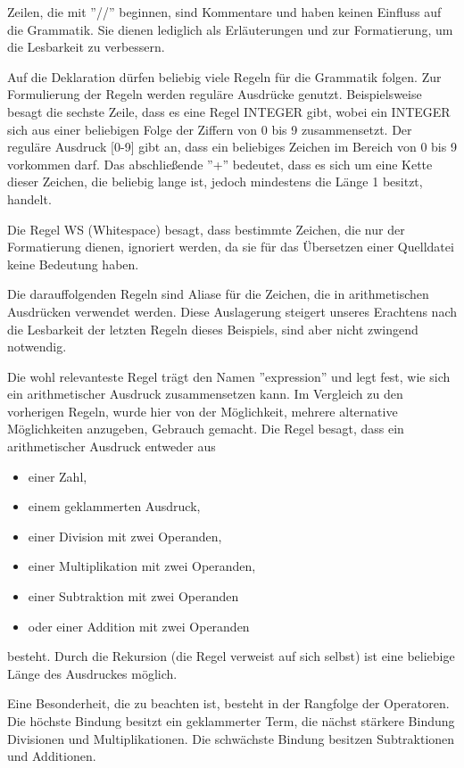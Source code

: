 Zeilen, die mit ''//'' beginnen, sind Kommentare und haben keinen Einfluss auf die Grammatik. Sie dienen lediglich als Erläuterungen und zur Formatierung, um die Lesbarkeit zu verbessern.

Auf die Deklaration dürfen beliebig viele Regeln für die Grammatik folgen. Zur Formulierung der Regeln werden reguläre Ausdrücke genutzt. Beispielsweise besagt die sechste Zeile, dass es eine Regel INTEGER gibt, wobei ein INTEGER sich aus einer beliebigen Folge der Ziffern von 0 bis 9 zusammensetzt. Der reguläre Ausdruck [0-9] gibt an, dass ein beliebiges Zeichen im Bereich von 0 bis 9 vorkommen darf. Das abschließende ''+'' bedeutet, dass es sich um eine Kette dieser Zeichen, die beliebig lange ist, jedoch mindestens die Länge 1 besitzt, handelt.

Die Regel WS (Whitespace) besagt, dass bestimmte Zeichen, die nur der Formatierung dienen, ignoriert werden, da sie für das Übersetzen einer Quelldatei keine Bedeutung haben.

Die darauffolgenden Regeln sind Aliase für die Zeichen, die in arithmetischen Ausdrücken verwendet werden. Diese Auslagerung steigert unseres Erachtens nach die Lesbarkeit der letzten Regeln dieses Beispiels, sind aber nicht zwingend notwendig.

Die wohl relevanteste Regel trägt den Namen ''expression'' und legt fest, wie sich ein arithmetischer Ausdruck zusammensetzen kann. Im Vergleich zu den vorherigen Regeln, wurde hier von der Möglichkeit, mehrere alternative Möglichkeiten anzugeben, Gebrauch gemacht. Die Regel besagt, dass ein arithmetischer Ausdruck entweder aus 
\begin{itemize}
\item einer Zahl,
\item einem geklammerten Ausdruck,
\item einer Division mit zwei Operanden,
\item einer Multiplikation mit zwei Operanden,
\item einer Subtraktion mit zwei Operanden
\item oder einer Addition mit zwei Operanden
\end{itemize}
besteht.
Durch die Rekursion (die Regel verweist auf sich selbst) ist eine beliebige Länge des Ausdruckes möglich.

Eine Besonderheit, die zu beachten ist, besteht in der Rangfolge der Operatoren. Die höchste Bindung besitzt ein geklammerter Term, die nächst stärkere Bindung Divisionen und Multiplikationen. Die schwächste Bindung besitzen Subtraktionen und Additionen.

